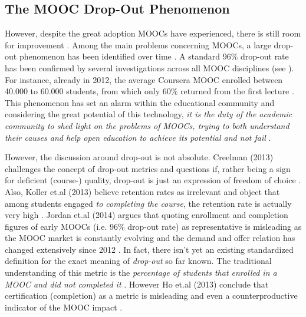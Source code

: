 \documentclass[
	a4paper,
	pdftex,
	12pt,	
	footinclude=true,
	fleqn,
	final,
	]{report}%
\begin{document}
\vspace{-0.3cm}
\subsection*{The MOOC Drop-Out Phenomenon}
\vspace{-0.3cm}

However, despite the great adoption MOOCs have experienced, there is still room for 
improvement \cite{Adamopoulos2013}. Among the main problems concerning MOOCs, a large drop-out 
phenomenon has been identified over time \cite{Hayes2015}. 
A standard 96\% drop-out rate has been confirmed by several investigations across all MOOC disciplines
(see \cite{Haggard2013,Koller2013,Christensen2013}).
For instance, already in 2012, the average Coursera MOOC enrolled between 40.000 to 
60.000 students, from which only 60\% returned from the first lecture \cite{Koller2013}.
This phenomenon has set an alarm within the educational community \cite{Hayes2015} and
considering the great potential of this technology,
\emph{it is the duty of the academic community to shed light on the problems of MOOCs, 
trying to both understand their causes and help open education to achieve its potential 
and not fail} \cite{Adamopoulos2013}. 

However, the discussion around drop-out is not absolute.
Creelman (2013) challenges the concept of drop-out metrics 
and questions if, rather being a sign for deficient (course-) quality, 
drop-out is just an expression of freedom of choice \cite{Creelman2013}. 
Also, Koller et.al (2013) believe retention rates as irrelevant and object 
that among students engaged \emph{to completing the course}, 
the retention rate is actually very high \cite{Koller2013}. 
Jordan et.al (2014) argues that quoting enrollment and completion figures of early MOOCs 
(i.e. 96\% drop-out rate) as representative is misleading \cite{Jordan2014} as the MOOC market 
is constantly evolving and the demand and offer relation has changed extensively 
since 2012 \cite{Hayes2015}. In fact, there isn't yet an existing standardized definition 
for the exact meaning of \emph{drop-out} so far known.
The traditional understanding  of this metric is the 
\emph{percentage of students that enrolled in a MOOC and did not completed it} \cite{Conole2013}.
However Ho et.al (2013) conclude that certification (completion) 
as a metric is misleading and even a counterproductive indicator of the 
MOOC impact \cite{Ho2013}.
\end{document}
